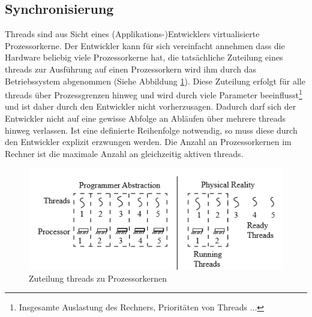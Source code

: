 \subsection{Synchronisierung}
Threads sind aus Sicht eines (Applikations-)Entwicklers virtualisierte Prozessorkerne. Der Entwickler kann für sich vereinfacht annehmen dass die Hardware beliebig viele Prozessorkerne hat, die tatsächliche Zuteilung eines threads zur Ausführung auf einen Prozessorkern wird ihm durch das Betriebssystem abgenommen (Siehe Abbildung \ref{fig:threads_cores}). Diese Zuteilung erfolgt für alle threads über Prozessgrenzen hinweg und wird durch viele Parameter beeinflusst\footnote{Insgesamte Auslastung des Rechners, Prioritäten von Threads ...} und ist daher durch den Entwickler nicht vorherzusagen. Dadurch darf sich der Entwickler nicht auf eine gewisse Abfolge an Abläufen über mehrere threads hinweg verlassen. Ist eine definierte Reihenfolge notwendig, so muss diese durch den Entwickler explizit erzwungen werden. Die Anzahl an Prozessorkernen im Rechner ist die maximale Anzahl an gleichzeitig aktiven threads.
\begin{figure}
	\centering
	\includegraphics[width=0.7\linewidth]{images/threads_cores.png}
	\caption{Zuteilung threads zu Prozessorkernen\cite[S. 140]{Dahlin2012}}
	\label{fig:threads_cores}
\end{figure}
\chapterend
